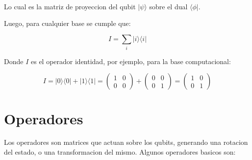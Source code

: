 \documentclass[11pt]{article}
\begin{document}
Lo cual es la matriz de proyeccion del qubit $|\psi\rangle$ sobre el dual $\langle \phi |$.

Luego, para cualquier base se cumple que:

\begin{equation}
    I = \sum_{i} |i\rangle \langle i |
\end{equation}

Donde $I$ es el operador identidad, por ejemplo, para la base computacional:

\begin{equation}
    I = |0\rangle \langle 0| + |1\rangle \langle 1| = \begin{pmatrix} 1 & 0 \\ 0 & 0 \end{pmatrix} + \begin{pmatrix} 0 & 0 \\ 0 & 1 \end{pmatrix} = \begin{pmatrix} 1 & 0 \\ 0 & 1 \end{pmatrix}
\end{equation}

\section{Operadores}

Los operadores son matrices que actuan sobre los qubits, generando una rotacion del estado, o una transformacion del mismo. Algunos operadores basicos son:
\end{document}
